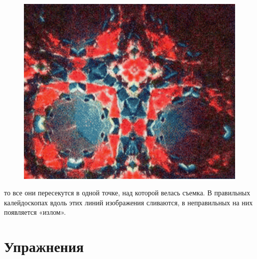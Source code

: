 \documentclass[a4paper, 11pt]{article}
\begin{document}
    \begin{minipage}[t]{0.6\textwidth}
        \begin{figure}[H]
            \setcounter{figure}{13}
            \centering
            \includegraphics[width=1\columnwidth]{1.png}
            \caption{}
        \end{figure}
        то все они пересекутся в одной точке, над которой велась съемка. В правильных калейдоскопах вдоль этих линий изображения сливаются, в неправильных на них появляется «излом».
        \titleformat{\section}{\filcenter}{}{}{}
        \section*{Упражнения}
        \begin{enumerate}


\end{enumerate}
\end{minipage}
\end{document}
